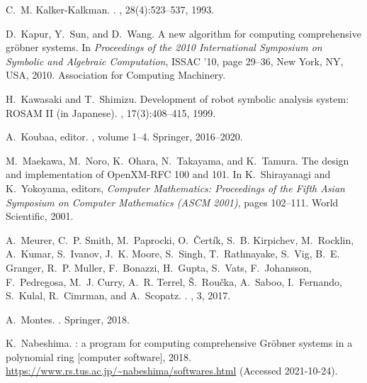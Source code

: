\documentclass{birkjour}
\theoremstyle{plain}
\theoremstyle{definition}
\begin{document}
\begin{thebibliography}{10}
        C.~M. Kalker-Kalkman.
        .
        , 28(4):523--537, 1993.

        D.~Kapur, Y.~Sun, and D.~Wang.
        \newblock A new algorithm for computing comprehensive gr\"{o}bner systems.
        \newblock In {\em Proceedings of the 2010 International Symposium on Symbolic
        and Algebraic Computation}, ISSAC '10, page 29–36, New York, NY, USA, 2010.
        Association for Computing Machinery.

        H.~Kawasaki and T.~Shimizu.
        \newblock Development of robot symbolic analysis system: {ROSAM II} (in
        {J}apanese).
        , 17(3):408--415, 1999.

        A.~Koubaa, editor.
        , volume
        1--4.
        \newblock Springer, 2016--2020.

        M.~Maekawa, M.~Noro, K.~Ohara, N.~Takayama, and K.~Tamura.
        \newblock The design and implementation of {OpenXM-RFC} 100 and 101.
        \newblock In K.~Shirayanagi and K.~Yokoyama, editors, {\em Computer
        Mathematics: Proceedings of the Fifth Asian Symposium on Computer Mathematics
        (ASCM 2001)}, pages 102--111. World Scientific, 2001.

        A.~Meurer, C.~P. Smith, M.~Paprocki, O.~{\v C}ert{\'i}k, S.~B. Kirpichev,
        M.~Rocklin, A.~Kumar, S.~Ivanov, J.~K. Moore, S.~Singh, T.~Rathnayake,
        S.~Vig, B.~E. Granger, R.~P. Muller, F.~Bonazzi, H.~Gupta, S.~Vats,
        F.~Johansson, F.~Pedregosa, M.~J. Curry, A.~R. Terrel, {\v S}.~Rou{\v c}ka,
        A.~Saboo, I.~Fernando, S.~Kulal, R.~Cimrman, and A.~Scopatz.
        .
        , 3, 2017.

        A.~Montes.
        .
        \newblock Springer, 2018.

        K.~Nabeshima.
        : a program for computing comprehensive {Gr\"obner} systems in a
        polynomial ring [computer software], 2018.
        \newblock \url{https://www.rs.tus.ac.jp/~nabeshima/softwares.html} (Accessed
        2021-10-24).


\end{thebibliography}
\end{document}
